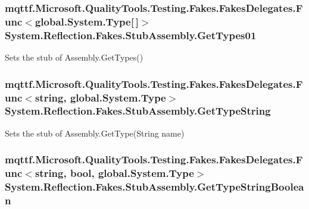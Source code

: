 \hypertarget{class_system_1_1_reflection_1_1_fakes_1_1_stub_assembly_a9aed6f783b1bbe0526554f5b13f9c04c}{
\subsubsection[{Get\-Types01}]{\setlength{\rightskip}{0pt plus 5cm}mqttf.\-Microsoft.\-Quality\-Tools.\-Testing.\-Fakes.\-Fakes\-Delegates.\-Func$<$global.\-System.\-Type\mbox{[}$\,$\mbox{]}$>$ System.\-Reflection.\-Fakes.\-Stub\-Assembly.\-Get\-Types01}}\label{class_system_1_1_reflection_1_1_fakes_1_1_stub_assembly_a9aed6f783b1bbe0526554f5b13f9c04c}


Sets the stub of Assembly.\-Get\-Types()

\hypertarget{class_system_1_1_reflection_1_1_fakes_1_1_stub_assembly_a288c281e4297182d10278fa34405f5ba}{
\subsubsection[{Get\-Type\-String}]{\setlength{\rightskip}{0pt plus 5cm}mqttf.\-Microsoft.\-Quality\-Tools.\-Testing.\-Fakes.\-Fakes\-Delegates.\-Func$<$string, global.\-System.\-Type$>$ System.\-Reflection.\-Fakes.\-Stub\-Assembly.\-Get\-Type\-String}}\label{class_system_1_1_reflection_1_1_fakes_1_1_stub_assembly_a288c281e4297182d10278fa34405f5ba}


Sets the stub of Assembly.\-Get\-Type(\-String name)

\hypertarget{class_system_1_1_reflection_1_1_fakes_1_1_stub_assembly_a9e5085aed72b945da2aaa7eee2a98f30}{
\subsubsection[{Get\-Type\-String\-Boolean}]{\setlength{\rightskip}{0pt plus 5cm}mqttf.\-Microsoft.\-Quality\-Tools.\-Testing.\-Fakes.\-Fakes\-Delegates.\-Func$<$string, bool, global.\-System.\-Type$>$ System.\-Reflection.\-Fakes.\-Stub\-Assembly.\-Get\-Type\-String\-Boolean}}\label{class_system_1_1_reflection_1_1_fakes_1_1_stub_assembly_a9e5085aed72b945da2aaa7eee2a98f30}


